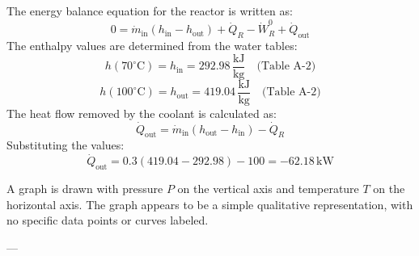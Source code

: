 The energy balance equation for the reactor is written as:  
\[
0 = \dot{m}_{\text{in}} \left( h_{\text{in}} - h_{\text{out}} \right) + \dot{Q}_R - \dot{W}_R^0 + \dot{Q}_{\text{out}}
\]  
The enthalpy values are determined from the water tables:  
\[
h(70^\circ\text{C}) = h_{\text{in}} = 292.98 \, \frac{\text{kJ}}{\text{kg}} \quad \text{(Table A-2)}
\]  
\[
h(100^\circ\text{C}) = h_{\text{out}} = 419.04 \, \frac{\text{kJ}}{\text{kg}} \quad \text{(Table A-2)}
\]  
The heat flow removed by the coolant is calculated as:  
\[
\dot{Q}_{\text{out}} = \dot{m}_{\text{in}} \left( h_{\text{out}} - h_{\text{in}} \right) - \dot{Q}_R
\]  
Substituting the values:  
\[
\dot{Q}_{\text{out}} = 0.3 \left( 419.04 - 292.98 \right) - 100 = -62.18 \, \text{kW}
\]

A graph is drawn with pressure \( P \) on the vertical axis and temperature \( T \) on the horizontal axis. The graph appears to be a simple qualitative representation, with no specific data points or curves labeled.

---